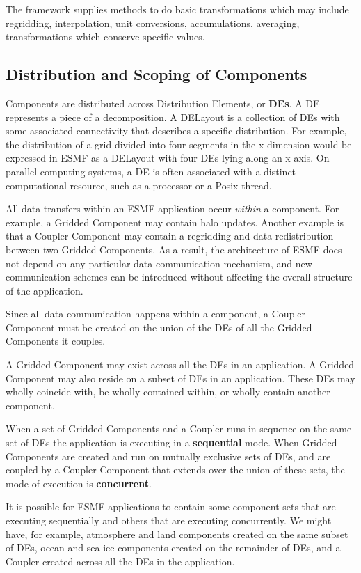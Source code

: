 The framework supplies methods to do basic transformations which 
may include regridding, interpolation, unit conversions, 
accumulations, averaging, transformations which conserve specific 
values.

\subsection{Distribution and Scoping of Components}
\label{sec:scoping}

Components are distributed across Distribution Elements, or {\bf DEs}.
A DE represents a piece of a decomposition.  A DELayout is a collection
of DEs with some associated connectivity that describes a specific 
distribution.  For example, the distribution of a grid divided 
into four segments in the x-dimension would be expressed in ESMF as
a DELayout with four DEs lying along an x-axis. On parallel computing
systems, a DE is often associated with a distinct computational resource, 
such as a processor or a Posix thread.  

All data transfers within an ESMF application occur {\it within} a 
component.  For example, a Gridded Component may contain halo updates.
Another example is that a Coupler Component may contain a regridding 
and data redistribution between two Gridded Components.  As a result, 
the architecture of ESMF does not depend on any particular data 
communication mechanism, and new communication schemes can be 
introduced without affecting the overall structure of the application.

Since all data communication happens within a component, a Coupler 
Component must be created on the union of the DEs of all
the Gridded Components it couples.  

A Gridded Component may exist across all the DEs in an application.  
A Gridded Component may also reside on a subset of DEs in an 
application.  These DEs may wholly coincide with, be wholly contained 
within, or wholly contain another component.  

When a set of Gridded  Components and a Coupler runs in sequence 
on the same set of DEs the application is executing in a {\bf sequential} 
mode. When Gridded Components are created and run on mutually exclusive
sets of DEs, and are coupled by a Coupler Component that extends over
the union of these sets, the mode of execution is {\bf concurrent}.

It is possible for ESMF applications to contain some component sets
that are executing sequentially and others that are executing concurrently.
We might have, for example, atmosphere and land components created 
on the same subset of DEs, ocean and sea ice components created on 
the remainder of DEs, and a Coupler created across all the DEs in
the application.

